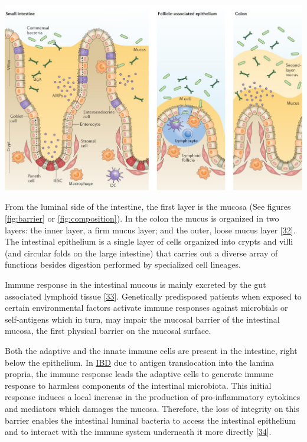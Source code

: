 \documentclass[
  12pt,
  a4paper,
  twoside,
  openright]{book}
\let\origfigure\figure
\let\endorigfigure\endfigure
\renewenvironment{figure}[1][2] {
    \expandafter\origfigure\expandafter[!htbp]
} {
    \endorigfigure
}
\begin{document}
\begin{figure}
\includegraphics[width=1\linewidth]{images/tesis_AC_FigureX} \caption[The intestinal epithelial barrier.]{The intestinal epithelial barrier. Graphic showing the small intestine with different cells types and the bacteria close to the intestinal epithelial. Adapted with permission from Mayorgas' 2021 thesis.}\label{fig:barrier}
\end{figure}

From the luminal side of the intestine, the first layer is the mucosa (See figures \ref{fig:barrier} or \ref{fig:composition}).
In the colon the mucus is organized in two layers: the inner layer, a firm mucus layer; and the outer, loose mucus layer {[}\protect\hyperlink{ref-okumura2017}{32}{]}.
The intestinal epithelium is a single layer of cells organized into crypts and villi (and circular folds on the large intestine) that carries out a diverse array of functions besides digestion performed by specialized cell lineages.

Immune response in the intestinal mucous is mainly excreted by the gut associated lymphoid tissue {[}\protect\hyperlink{ref-faria2012}{33}{]}.
Genetically predisposed patients when exposed to certain environmental factors activate immune responses against microbials or self-antigens which in turn, may impair the mucosal barrier of the intestinal mucosa, the first physical barrier on the mucosal surface.

Both the adaptive and the innate immune cells are present in the intestine, right below the epithelium.
In \protect\hyperlink{acronyms_IBD}{IBD} due to antigen translocation into the lamina propria, the immune response leads the adaptive cells to generate immune response to harmless components of the intestinal microbiota.
This initial response induces a local increase in the production of pro-inflammatory cytokines and mediators which damages the mucosa.
Therefore, the loss of integrity on this barrier enables the intestinal luminal bacteria to access the intestinal epithelium and to interact with the immune system underneath it more directly {[}\protect\hyperlink{ref-hisamatsu2013}{34}{]}.
\end{document}
